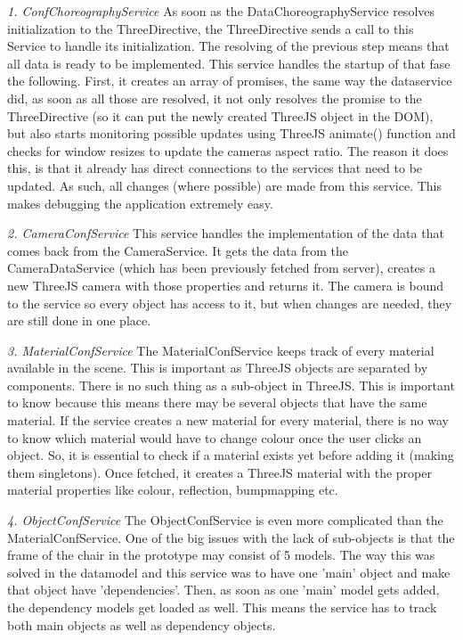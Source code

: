 \textit{1. ConfChoreographyService} \newline
As soon as the DataChoreographyService resolves initialization to the ThreeDirective, the ThreeDirective sends a call to this Service to handle its initialization. The resolving of the previous step means that all data is ready to be implemented. This service handles the startup of that fase the following. First, it creates an array of promises, the same way the dataservice did, as soon as all those are resolved, it not only resolves the promise to the ThreeDirective (so it can put the newly created ThreeJS object in the DOM), but also starts monitoring possible updates using ThreeJS animate() function and checks for window resizes to update the cameras aspect ratio. The reason it does this, is that it already has direct connections to the services that need to be updated. As such, all changes (where possible) are made from this service. This makes debugging the application extremely easy.

\textit{2. CameraConfService} \newline
This service handles the implementation of the data that comes back from the CameraService. It gets the data from the CameraDataService (which has been previously fetched from server), creates a new ThreeJS camera with those properties and returns it. The camera is bound to the service so every object has access to it, but when changes are needed, they are still done in one place.

\textit{3. MaterialConfService} \newline
The MaterialConfService keeps track of every material available in the scene. This is important as ThreeJS objects are separated by components. There is no such thing as a sub-object in ThreeJS. This is important to know because this means there may be several objects that have the same material. If the service creates a new material for every material, there is no way to know which material would have to change colour once the user clicks an object. So, it is essential to check if a material exists yet before adding it (making them singletons). Once fetched, it creates a ThreeJS material with the proper material properties like colour, reflection, bumpmapping etc.

\textit{4. ObjectConfService} \newline
The ObjectConfService is even more complicated than the MaterialConfService. One of the big issues with the lack of sub-objects is that the frame of the chair in the prototype may consist of 5 models. The way this was solved in the datamodel and this service was to have one 'main' object and make that object have 'dependencies'. Then, as soon as one 'main' model gets added, the dependency models get loaded as well. This means the service has to track both main objects as well as dependency objects.

